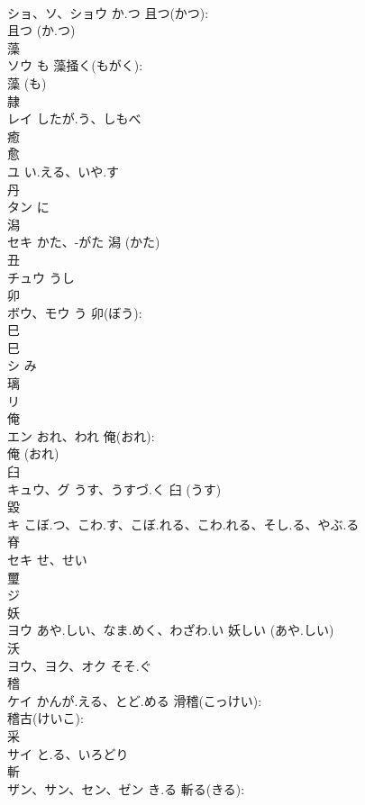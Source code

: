 \documentclass[8pt]{extreport}
\begin{document}
\begin{CJK}{UTF8}{min}
\\	ショ、ソ、ショウ	か.つ	且つ(かつ): 
\\	且つ (か.つ)
\\	藻			
\\	ソウ	も	藻掻く(もがく): 
\\	藻 (も)
\\	隷			
\\	レイ	したが.う、しもべ		
\\	癒			
\\	愈 
\\	ユ	い.える、いや.す		
\\	丹			
\\	タン	に		
\\	潟			
\\	セキ	かた、-がた		潟 (かた)
\\	丑			
\\	チュウ	うし		
\\	卯			
\\	ボウ、モウ	う	卯(ぼう): 
\\	巳			
\\	巳
\\	シ	み		
\\	璃			
\\	リ			
\\	俺			
\\	エン	おれ、われ	俺(おれ): 
\\	俺 (おれ)
\\	臼			
\\	キュウ、グ	うす、うすづ.く		臼 (うす)
\\	毀			
\\	キ	こぼ.つ、こわ.す、こぼ.れる、こわ.れる、そし.る、やぶ.る		
\\	脊			
\\	セキ	せ、せい		
\\	璽			
\\	ジ			
\\	妖			
\\	ヨウ	あや.しい、なま.めく、わざわ.い		妖しい (あや.しい)
\\	沃			
\\	ヨウ、ヨク、オク	そそ.ぐ		
\\	稽			
\\	ケイ	かんが.える、とど.める	滑稽(こっけい): 
\\	稽古(けいこ): 
\\	采			
\\	サイ	と.る、いろどり		
\\	斬			
\\	ザン、サン、セン、ゼン	き.る	斬る(きる): 

\end{CJK}
\end{document}
